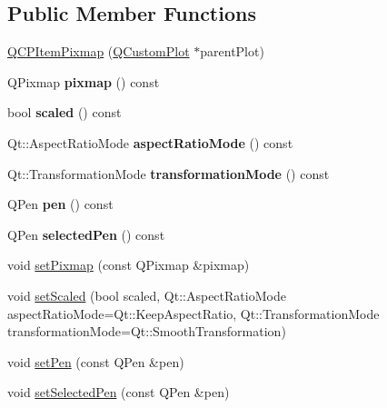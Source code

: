 \subsection*{Public Member Functions}
\begin{DoxyCompactItemize}
\item 
\hyperlink{class_q_c_p_item_pixmap_aa6de42a37261b21a5480e7da122345c3}{Q\+C\+P\+Item\+Pixmap} (\hyperlink{class_q_custom_plot}{Q\+Custom\+Plot} $\ast$parent\+Plot)
\item 
\mbox{\label{class_q_c_p_item_pixmap_a7daef7e0c432902d69e7db3e0e217a1f}} 
Q\+Pixmap {\bfseries pixmap} () const
\item 
\mbox{\label{class_q_c_p_item_pixmap_a8768534b5f3080abfc007db198373327}} 
bool {\bfseries scaled} () const
\item 
\mbox{\label{class_q_c_p_item_pixmap_a662cbca12e6cdcd2a94b0b08879292fd}} 
Qt\+::\+Aspect\+Ratio\+Mode {\bfseries aspect\+Ratio\+Mode} () const
\item 
\mbox{\label{class_q_c_p_item_pixmap_ab963aa9693d49c323948f2820a5785b6}} 
Qt\+::\+Transformation\+Mode {\bfseries transformation\+Mode} () const
\item 
\mbox{\label{class_q_c_p_item_pixmap_a6ae9922eba6386a5ac4e2a569ec29e1f}} 
Q\+Pen {\bfseries pen} () const
\item 
\mbox{\label{class_q_c_p_item_pixmap_a23806a20efcb172f0309e18809dc49d8}} 
Q\+Pen {\bfseries selected\+Pen} () const
\item 
void \hyperlink{class_q_c_p_item_pixmap_a726b69ea4025edf48f9b29b6450548a7}{set\+Pixmap} (const Q\+Pixmap \&pixmap)
\item 
void \hyperlink{class_q_c_p_item_pixmap_ab4d44529a1c6c8d37d0ea7560e042777}{set\+Scaled} (bool scaled, Qt\+::\+Aspect\+Ratio\+Mode aspect\+Ratio\+Mode=Qt\+::\+Keep\+Aspect\+Ratio, Qt\+::\+Transformation\+Mode transformation\+Mode=Qt\+::\+Smooth\+Transformation)
\item 
void \hyperlink{class_q_c_p_item_pixmap_acdade1305edb4b5cae14f97fd132065f}{set\+Pen} (const Q\+Pen \&pen)
\item 
void \hyperlink{class_q_c_p_item_pixmap_afc5e479e88e53740176ce77cb70dd67a}{set\+Selected\+Pen} (const Q\+Pen \&pen)

\end{DoxyCompactItemize}
